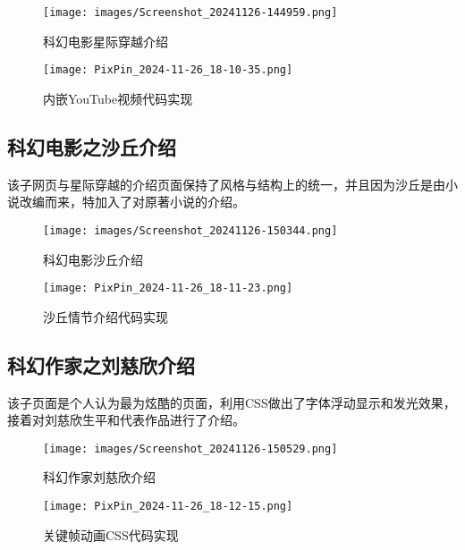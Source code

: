 \documentclass[supercite]{Experimental_Report}
\theoremstyle{definition}
\begin{document}
\begin{figure}[htb]
    \centering
    \texttt{[image: images/Screenshot\_20241126-144959.png]}
    \caption{科幻电影星际穿越介绍}
    \label{fig:enter-label}
\end{figure}

\begin{figure}[htb]
    \centering
    \texttt{[image: PixPin\_2024-11-26\_18-10-35.png]}
    \caption{内嵌YouTube视频代码实现}
    \label{fig:enter-label}
\end{figure}

\newpage

\subsection{科幻电影之沙丘介绍}

该子网页与星际穿越的介绍页面保持了风格与结构上的统一，并且因为沙丘是由小说改编而来，特加入了对原著小说的介绍。

\begin{figure}[htb]
    \centering
    \texttt{[image: images/Screenshot\_20241126-150344.png]}
    \caption{科幻电影沙丘介绍}
    \label{fig:enter-label}
\end{figure}

\begin{figure}[htb]
    \centering
    \texttt{[image: PixPin\_2024-11-26\_18-11-23.png]}
    \caption{沙丘情节介绍代码实现}
    \label{fig:enter-label}
\end{figure}

\newpage

\subsection{科幻作家之刘慈欣介绍}

该子页面是个人认为最为炫酷的页面，利用CSS做出了字体浮动显示和发光效果，接着对刘慈欣生平和代表作品进行了介绍。

\begin{figure}[htb]
    \centering
    \texttt{[image: images/Screenshot\_20241126-150529.png]}
    \caption{科幻作家刘慈欣介绍}
    \label{fig:enter-label}
\end{figure}

\begin{figure}[htb]
    \centering
    \texttt{[image: PixPin\_2024-11-26\_18-12-15.png]}
    \caption{关键帧动画CSS代码实现}
    \label{fig:enter-label}
\end{figure}
\end{document}
